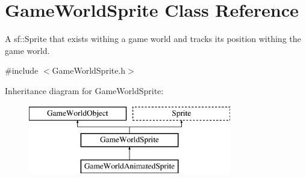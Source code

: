 \hypertarget{class_game_world_sprite}{}\section{Game\+World\+Sprite Class Reference}
\label{class_game_world_sprite}


A sf\+::\+Sprite that exists withing a game world and tracks its position withing the game world.  




{\ttfamily \#include $<$Game\+World\+Sprite.\+h$>$}

Inheritance diagram for Game\+World\+Sprite\+:\begin{figure}[H]
\begin{center}
\leavevmode
\includegraphics[height=3.000000cm]{class_game_world_sprite}
\end{center}
\end{figure}
